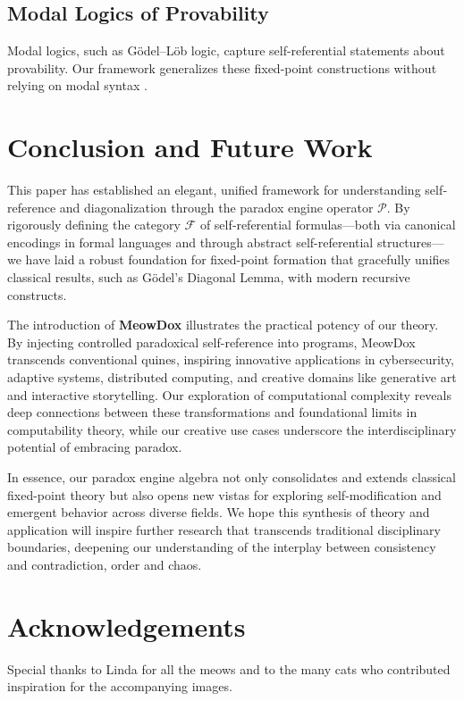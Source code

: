 \documentclass[12pt]{amsart}
\theoremstyle{plain}
\theoremstyle{definition}
\theoremstyle{remark}
\begin{document}
\subsection{Modal Logics of Provability}
Modal logics, such as Gödel–Löb logic, capture self-referential statements about provability. Our framework generalizes these fixed-point constructions without relying on modal syntax \cite{Chagrov1997}.


\section{Conclusion and Future Work}
This paper has established an elegant, unified framework for understanding self‐reference and diagonalization through the paradox engine operator $\mathcal{P}$. By rigorously defining the category $\mathcal{F}$ of self‐referential formulas---both via canonical encodings in formal languages and through abstract self-referential structures---we have laid a robust foundation for fixed-point formation that gracefully unifies classical results, such as Gödel’s Diagonal Lemma, with modern recursive constructs.

The introduction of \textbf{MeowDox} illustrates the practical potency of our theory. By injecting controlled paradoxical self-reference into programs, MeowDox transcends conventional quines, inspiring innovative applications in cybersecurity, adaptive systems, distributed computing, and creative domains like generative art and interactive storytelling. Our exploration of computational complexity reveals deep connections between these transformations and foundational limits in computability theory, while our creative use cases underscore the interdisciplinary potential of embracing paradox.

In essence, our paradox engine algebra not only consolidates and extends classical fixed-point theory but also opens new vistas for exploring self-modification and emergent behavior across diverse fields. We hope this synthesis of theory and application will inspire further research that transcends traditional disciplinary boundaries, deepening our understanding of the interplay between consistency and contradiction, order and chaos.

\section*{Acknowledgements}
Special thanks to Linda for all the meows and to the many cats who contributed inspiration for the accompanying images.
\end{document}
